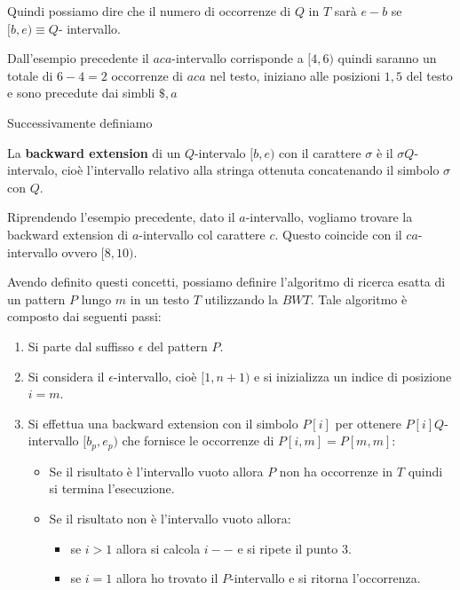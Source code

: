Quindi possiamo dire che il numero di occorrenze di $Q$ in $T$ sarà $e-b$ se $[b,e)\equiv Q$-
intervallo.
\begin{esempio}
    Dall'esempio precedente il $aca$-intervallo corrisponde a $[4,6)$ quindi
    saranno un totale di $6-4= 2$ occorrenze di $aca$ nel testo, iniziano alle
    posizioni $1,5$ del testo e sono precedute dai simbli $\$,a$
\end{esempio}
Successivamente definiamo
\begin{definizione}
    La \textbf{backward extension} di un $Q$-intervalo $[b,e)$ con il carattere
    $\sigma$ è il $\sigma Q$-intervalo, cioè l'intervallo relativo alla stringa
    ottenuta concatenando il simbolo $\sigma$ con $Q$.
\end{definizione}
\begin{esempio}
    Riprendendo l'esempio precedente, dato il $a$-intervallo, vogliamo trovare la
    backward extension di $a$-intervallo col carattere $c$. Questo coincide con
    il  $ca$-intervallo ovvero $[8,10)$.
\end{esempio}
Avendo definito questi concetti, possiamo definire l'algoritmo di ricerca esatta
di un pattern $P$ lungo $m$ in un testo $T$ utilizzando la $BWT$. Tale algoritmo
è composto dai seguenti passi:
\begin{enumerate}
    \item Si parte dal suffisso $\epsilon$ del pattern $P$.
    \item Si considera il $\epsilon$-intervallo, cioè $[1,n+1)$ e si inizializza
          un indice di posizione $i=m$.
    \item Si effettua una backward extension con il simbolo $P[i]$ per ottenere
          $P[i]Q$-intervallo $[b_p, e_p)$ che fornisce le occorrenze di $P[i,m] = P[m,m]$:
          \begin{itemize}
              \item Se il risultato è l'intervallo vuoto allora $P$ non ha
                    occorrenze in $T$ quindi si termina l'esecuzione.
              \item Se il risultato non è l'intervallo vuoto allora:
                    \begin{itemize}
                        \item se $i>1$ allora si calcola $i--$ e si ripete il punto $3$.
                        \item se $i=1$ allora ho trovato il $P$-intervallo e
                              si ritorna l'occorrenza.
                    \end{itemize}
          \end{itemize}
\end{enumerate}
